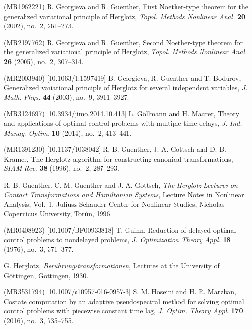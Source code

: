 \documentclass{my-aims}
\theoremstyle{definition}
\begin{document}
\begin{thebibliography}{99}
 (MR1962221)
\newblock B. Georgieva and R. Guenther,
\newblock First Noether-type theorem for the generalized variational principle of Herglotz,
\newblock \emph{Topol. Methods Nonlinear Anal.} {\bf 20} (2002), no.~2, 261--273.

 (MR2197762)
\newblock B. Georgieva and R. Guenther,
\newblock Second Noether-type theorem for the generalized variational principle of Herglotz,
\newblock \emph{Topol. Methods Nonlinear Anal.} {\bf 26} (2005), no.~2, 307--314.

 (MR2003940) [10.1063/1.1597419]
\newblock B. Georgieva, R. Guenther and T. Bodurov,
\newblock Generalized variational principle of Herglotz for several independent variables,
\newblock \emph{J. Math. Phys.} {\bf 44} (2003), no.~9, 3911--3927.

 (MR3124697) [10.3934/jimo.2014.10.413] 
\newblock L. G\"ollmann and H. Maurer, 
\newblock Theory and applications of optimal control problems with multiple time-delays,
\newblock \emph{J. Ind. Manag. Optim.} {\bf 10} (2014), no.~2, 413--441. 

 (MR1391230) [10.1137/1038042]
\newblock R. B. Guenther, J. A. Gottsch and D. B. Kramer,
\newblock The Herglotz algorithm for constructing canonical transformations,
\newblock \emph{SIAM Rev.} {\bf 38} (1996), no.~2, 287--293.

\newblock R. B. Guenther, C. M. Guenther and J. A. Gottsch,
\newblock \emph{The Herglotz Lectures on Contact Transformations and Hamiltonian Systems},
\newblock Lecture Notes in Nonlinear Analysis, Vol.~1,
Juliusz Schauder Center for Nonlinear Studies,
Nicholas Copernicus University, Tor\'{u}n, 1996.
	
 (MR0408923) [10.1007/BF00933818]
\newblock T. Guinn,
\newblock Reduction of delayed optimal control problems to nondelayed problems,
\newblock \emph{J. Optimization Theory Appl.} {\bf 18} (1976), no.~3, 371--377.

\newblock G. Herglotz,
\newblock \emph{Ber\"uhrungstransformationen},
\newblock Lectures at the University of G\"ottingen, G\"ottingen, 1930.

 (MR3531794) [10.1007/s10957-016-0957-3]  
\newblock S. M. Hoseini and H. R. Marzban, 
\newblock Costate computation by an adaptive pseudospectral method for solving 
optimal control problems with piecewise constant time lag, 
\newblock \emph{J. Optim. Theory Appl.} {\bf 170} (2016), no.~3, 735--755. 


\end{thebibliography}
\end{document}
